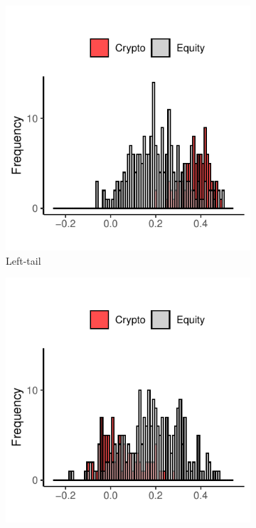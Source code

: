 \documentclass{article}
\begin{document}
\begin{figure}[H]
\centering
\begin{subfigure}{.33\textwidth}
  \centering
  \includegraphics[width=\linewidth]{Figures/hist_lower.pdf}
  \caption{Left-tail}
  \label{fig:hist-sub1}
\end{subfigure}%
\begin{subfigure}{.33\textwidth}
  \centering
  \includegraphics[width=\linewidth]{Figures/hist_upper.pdf}

\end{subfigure}
\end{figure}
\end{document}

